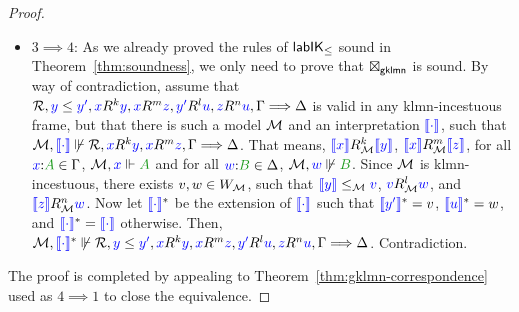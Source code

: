 \begin{proof}
\begin{itemize}
		\item $3 \implies 4$:
		As we already proved the rules of $\labIKp$ sound in Theorem~\ref{thm:soundness}, we only need to prove that $\gklmn$ is sound.
		By way of contradiction, assume that $\B, \futs{y}{y'}, \lb x R^{k} \lb y, \lb x R^{m} \lb z, \lb{y'}R^{l} \lb u, \lb z R^{n} \lb u, \Left\SEQ\Right$ is valid in any klmn-incestuous frame,
		but that there is such a model $\M$ and an interpretation $\inter\cdot$, such
		that $\M,\inter\cdot\not\Vdash\B, \lb x R^{k} \lb y, \lb x R^{m} \lb z, \Left \SEQ \Right$.
		That means, $\inter x \rel_\M^k \inter y$, $\inter x \rel_\M^m\inter z$, for all $\labels{x}{A} \in \Left$, $\cforce \M xA$ and for all $\labels wB\in\Right$,
		$\cnforce \M wB$. 
		Since $\M$ is klmn-incestuous, there exists $v,w\in W_\M$, such that $\inter y \le_\M \lb{v}$, $\lb{v} R_\M^l \lb{w}$, and $\inter z R_\M^n \lb{w}$.
		Now let $\inter\cdot^*$ be the extension of $\inter\cdot$ such that $\inter{y'}^* = v$, $\inter{u}^* = w$, and $\inter\cdot^* = \inter\cdot$ otherwise.
		Then, $ \nforce \M {\inter\cdot^*} {\B, \futs{y}{y'}, \lb x R^{k} \lb y, \lb x R^{m} \lb z, \lb{y'}R^{l} \lb u, \lb z R^{n} \lb u, \Left\SEQ\Right}$. Contradiction.
	\end{itemize}
	
	The proof is completed by appealing to Theorem~\ref{thm:gklmn-correspondence} used as $4 \implies 1$ to close the equivalence.
\end{proof}

%
%

